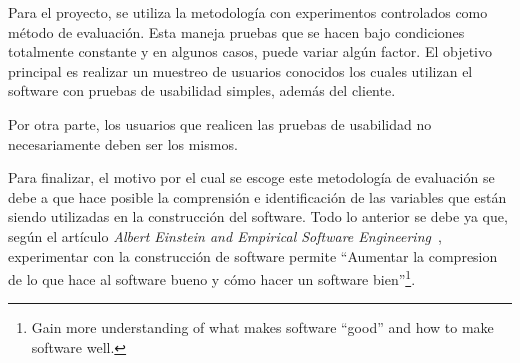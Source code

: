 Para el proyecto, se utiliza la metodología con experimentos controlados como método de evaluación. Esta maneja pruebas que se hacen bajo condiciones totalmente constante y en algunos casos, puede variar algún factor. El objetivo principal es realizar un muestreo de usuarios conocidos los cuales utilizan el software con pruebas de usabilidad simples, además del cliente.

Por otra parte, los usuarios que realicen las pruebas de usabilidad  no necesariamente deben ser los mismos.

Para finalizar, el motivo por el cual se escoge este metodología de evaluación se debe a que hace posible la comprensión e identificación de las variables que están siendo utilizadas en la construcción del software.  Todo lo anterior se debe ya que, según el artículo \emph{Albert Einstein and Empirical Software Engineering}~\cite{8}, experimentar con la construcción de software permite ``Aumentar la compresion de lo que hace al software bueno y cómo hacer un software bien''\footnote{Gain more understanding of what makes software ``good'' and how to make software well.}.